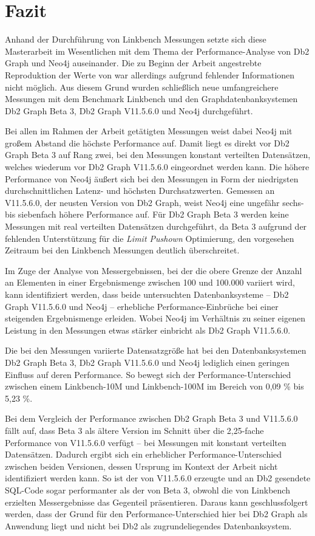 \chapter{Fazit}
\label{fazit}
Anhand der Durchführung von Linkbench Messungen setzte sich diese Masterarbeit im Wesentlichen mit dem Thema der Performance-Analyse von Db2 Graph und Neo4j auseinander. Die zu Beginn der Arbeit angestrebte Reproduktion der Werte von  war allerdings aufgrund fehlender Informationen nicht möglich. Aus diesem Grund wurden schließlich neue umfangreichere Messungen mit dem Benchmark Linkbench und den Graphdatenbanksystemen Db2 Graph Beta 3, Db2 Graph V11.5.6.0 und Neo4j durchgeführt. 

Bei allen im Rahmen der Arbeit getätigten Messungen weist dabei Neo4j mit großem Abstand die höchste Performance auf. Damit liegt es direkt vor Db2 Graph Beta 3 auf Rang zwei, bei den Messungen konstant verteilten Datensätzen, welches wiederum vor Db2 Graph V11.5.6.0 eingeordnet werden kann. Die höhere Performance von Neo4j äußert sich bei den Messungen in Form der niedrigsten durchschnittlichen Latenz- und höchsten Durchsatzwerten. Gemessen an V11.5.6.0, der neusten Version von Db2 Graph, weist Neo4j eine ungefähr sechs- bis siebenfach höhere Performance auf. Für Db2 Graph Beta 3 werden keine Messungen mit real verteilten Datensätzen durchgeführt, da Beta 3 aufgrund der fehlenden Unterstützung für die \textit{Limit Pushown} Optimierung, den vorgesehen Zeitraum bei den Linkbench Messungen deutlich überschreitet.

Im Zuge der Analyse von Messergebnissen, bei der die obere Grenze der Anzahl an Elementen in einer Ergebnismenge zwischen 100 und 100.000 variiert wird, kann identifiziert werden, dass beide  untersuchten Datenbanksysteme -- Db2 Graph V11.5.6.0 und Neo4j -- erhebliche Performance-Einbrüche bei einer steigenden Ergebnismenge erleiden. Wobei Neo4j im Verhältnis zu seiner eigenen Leistung in den Messungen etwas stärker einbricht als Db2 Graph V11.5.6.0. 

Die bei den Messungen variierte Datensatzgröße hat bei den Datenbanksystemen Db2 Graph Beta 3, Db2 Graph V11.5.6.0 und Neo4j lediglich einen geringen Einfluss auf deren Performance. So bewegt sich der Performance-Unterschied zwischen einem Linkbench-10M und Linkbench-100M im Bereich von 0,09 \% bis 5,23 \%.

Bei dem Vergleich der Performance zwischen Db2 Graph Beta 3 und V11.5.6.0 fällt auf, dass Beta 3 als ältere Version im Schnitt über die 2,25-fache Performance von V11.5.6.0 verfügt -- bei Messungen mit konstant verteilten Datensätzen. Dadurch ergibt sich ein erheblicher Performance-Unterschied zwischen beiden Versionen, dessen Ursprung im Kontext der Arbeit nicht identifiziert werden kann. So ist der von V11.5.6.0 erzeugte und an Db2 gesendete SQL-Code sogar performanter als der von Beta 3, obwohl die von Linkbench erzielten Messergebnisse das Gegenteil präsentieren. Daraus kann geschlussfolgert werden, dass der Grund für den Performance-Unterschied hier bei Db2 Graph als Anwendung liegt und nicht bei Db2 als zugrundeliegendes Datenbanksystem.

